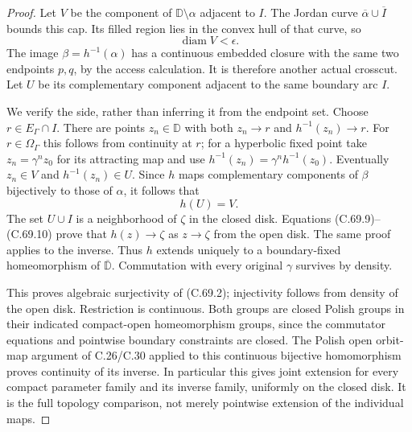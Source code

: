 \begin{proof}
Let $V$ be the component of
$\mathbb D\setminus\alpha$ adjacent
to $I$. The Jordan curve
$\overline\alpha\cup\overline I$
bounds this cap. Its filled region
lies in the convex hull of that
curve, so
\[
                           \operatorname{diam} V<\epsilon .
                                                               \tag{C.69.9}
\]
The image $\beta=h^{-1}(\alpha)$
has a continuous embedded closure
with the same two endpoints $p,q$,
by the access calculation.
It is therefore another actual
crosscut. Let $U$ be its complementary
component adjacent to the same
boundary arc $I$.

We verify the side, rather than
inferring it from the endpoint set.
Choose $r\in E_\Gamma\cap I$.
There are points $z_n\in\mathbb D$
with both $z_n\to r$ and
$h^{-1}(z_n)\to r$.
For $r\in\Omega_\Gamma$ this follows
from continuity at $r$; for a
hyperbolic fixed point take
$z_n=\gamma^n z_0$ for its attracting
map and use
$h^{-1}(z_n)=\gamma^n h^{-1}(z_0)$.
Eventually $z_n\in V$ and
$h^{-1}(z_n)\in U$.
Since $h$ maps complementary
components of $\beta$ bijectively
to those of $\alpha$, it follows
that
\[
                               h(U)=V .
                                                               \tag{C.69.10}
\]
The set $U\cup I$ is a neighborhood
of $\zeta$ in the closed disk.
Equations (C.69.9)--(C.69.10)
prove that $h(z)\to\zeta$ as
$z\to\zeta$ from the open disk.
The same proof applies to the
inverse. Thus $h$ extends uniquely
to a boundary-fixed homeomorphism
of $\overline{\mathbb D}$.
Commutation with every original
$\gamma$ survives by density.

This proves algebraic surjectivity
of (C.69.2); injectivity follows
from density of the open disk.
Restriction is continuous. Both
groups are closed Polish groups
in their indicated compact-open
homeomorphism groups, since the
commutator equations and pointwise
boundary constraints are closed.
The Polish open orbit-map argument
of C.26/C.30 applied to this
continuous bijective homomorphism
proves continuity of its inverse.
In particular this gives joint
extension for every compact
parameter family and its inverse
family, uniformly on the closed
disk. It is the full topology
comparison, not merely pointwise
extension of the individual maps.


\end{proof}
